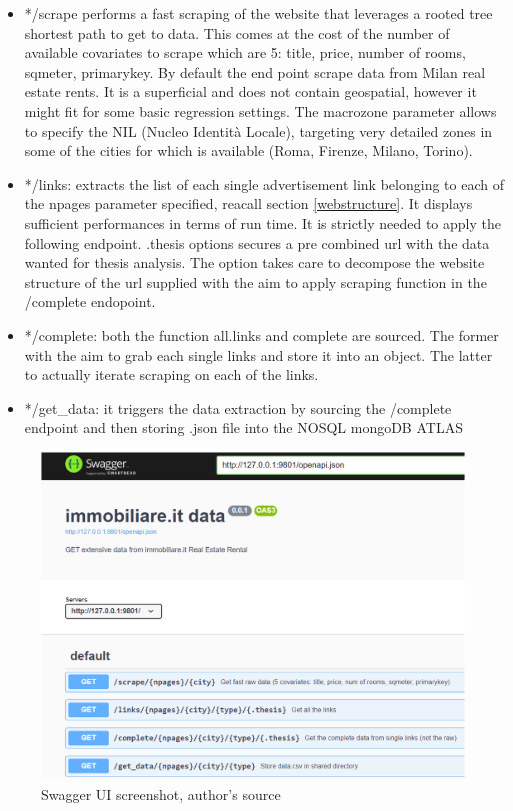 \documentclass[
  12pt,
  a4paper,
  oneside]{book}
\theoremstyle{definition}
\theoremstyle{definition}
\theoremstyle{definition}
\theoremstyle{remark}
\begin{document}
\begin{itemize}
\item
  */scrape performs a fast scraping of the website that leverages a rooted tree shortest path to get to data. This comes at the cost of the number of available covariates to scrape which are 5: title, price, number of rooms, sqmeter, primarykey. By default the end point scrape data from Milan real estate rents. It is a superficial and does not contain geospatial, however it might fit for some basic regression settings. The macrozone parameter allows to specify the NIL (Nucleo Identità Locale), targeting very detailed zones in some of the cities for which is available (Roma, Firenze, Milano, Torino).
\item
  */links: extracts the list of each single advertisement link belonging to each of the npages parameter specified, reacall section \ref{webstructure}. It displays sufficient performances in terms of run time. It is strictly needed to apply the following endpoint. .thesis options secures a pre combined url with the data wanted for thesis analysis. The option takes care to decompose the website structure of the url supplied with the aim to apply scraping function in the /complete endopoint.
\item
  */complete: both the function all.links and complete are sourced. The former with the aim to grab each single links and store it into an object. The latter to actually iterate scraping on each of the links.
\item
  */get\_data: it triggers the data extraction by sourcing the /complete endpoint and then storing .json file into the NOSQL mongoDB ATLAS
\end{itemize}

\begin{figure}
\centering
\includegraphics{images/swagger.PNG}
\caption{Swagger UI screenshot, author's source}
\end{figure}
\end{document}
